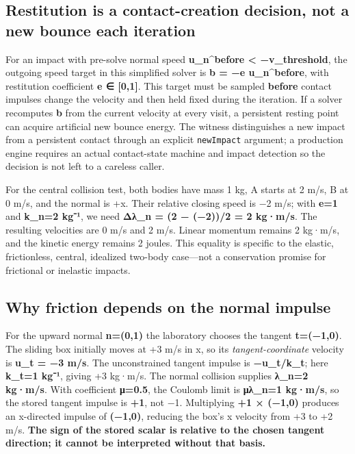 \subsection{Restitution is a contact-creation decision, not a new bounce each iteration}\label{appendix-c9d92e145503-restitution-is-a-contact-creation-decision-not-a-new-bounce-each-iteration}

For an impact with pre-solve normal speed \textbf{u\_n\^{}before \textless{} −v\_threshold}, the outgoing speed target in this simplified solver is \textbf{b = −e u\_n\^{}before}, with restitution coefficient \textbf{e ∈ {[}0,1{]}}. This target must be sampled \textbf{before} contact impulses change the velocity and then held fixed during the iteration. If a solver recomputes \textbf{b} from the current velocity at every visit, a persistent resting point can acquire artificial new bounce energy. The witness distinguishes a new impact from a persistent contact through an explicit \texttt{newImpact} argument; a production engine requires an actual contact-state machine and impact detection so the decision is not left to a careless caller.

For the central collision test, both bodies have mass 1 kg, A starts at 2 m/s, B at 0 m/s, and the normal is +x. Their relative closing speed is −2 m/s; with \textbf{e=1} and \textbf{k\_n=2 kg⁻¹}, we need \textbf{Δλ\_n = (2 − (−2))/2 = 2 kg·m/s}. The resulting velocities are 0 m/s and 2 m/s. Linear momentum remains 2 kg·m/s, and the kinetic energy remains 2 joules. This equality is specific to the elastic, frictionless, central, idealized two-body case---not a conservation promise for frictional or inelastic impacts.

\subsection{Why friction depends on the normal impulse}\label{appendix-c9d92e145503-why-friction-depends-on-the-normal-impulse}

For the upward normal \textbf{n=(0,1)} the laboratory chooses the tangent \textbf{t=(−1,0)}. The sliding box initially moves at +3 m/s in x, so its \emph{tangent-coordinate} velocity is \textbf{u\_t = −3 m/s}. The unconstrained tangent impulse is \textbf{−u\_t/k\_t}; here \textbf{k\_t=1 kg⁻¹}, giving +3 kg·m/s. The normal collision supplies \textbf{λ\_n=2 kg·m/s}. With coefficient \textbf{μ=0.5}, the Coulomb limit is \textbf{μλ\_n=1 kg·m/s}, so the stored tangent impulse is \textbf{+1}, not −1. Multiplying \textbf{+1 × (−1,0)} produces an x-directed impulse of \textbf{(−1,0)}, reducing the box's x velocity from +3 to +2 m/s. \textbf{The sign of the stored scalar is relative to the chosen tangent direction; it cannot be interpreted without that basis.}

